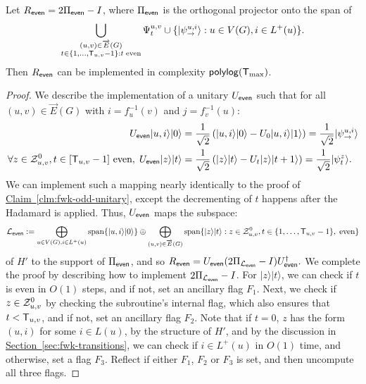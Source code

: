 \documentclass{theoretics}
\renewcommand{\sec}[1]{\hyperref[sec:#1]{Section~\ref*{sec:#1}}}
\newcommand{\clm}[1]{\hyperref[clm:#1]{Claim~\ref*{clm:#1}}}
\def\ket#1{{\lvert}#1\rangle}
\renewcommand{\>}{\rangle}
\newcommand{\<}{\langle}
\renewcommand{\(}{\left(}
\renewcommand{\)}{\right)}
\begin{document}
\begin{claim}\label{clm:fwk-even-unitary}
Let $R_{\sf even} =2\Pi_{\sf even}-I$, where $\Pi_{\sf even}$ is the orthogonal projector onto the span of
$$\bigcup_{\substack{(u,v)\in\overrightarrow{E}(G)\\t\in\{1,\dots,{\sf T}_{u,v}-1\}: t\;\mathrm{ even}}}\Psi_t^{u,v}\cup\{\ket{\psi_{\rightarrow}^{u,i}}:u\in V(G),i\in L^+(u)\}.$$
Then $R_{\sf even}$ can be implemented in complexity ${\sf polylog}({\sf T}_{\max})$. 
\end{claim}
\begin{proof}
We describe the implementation of a unitary $U_{\sf even}$ such that for all $(u,v)\in\overrightarrow{E}(G)$ with $i=f_u^{-1}(v)$ and $j=f_v^{-1}(u)$:
\vskip-18pt
\begin{equation*}
\begin{split}
U_{\sf even}\ket{u,i}\ket{0} &= \frac{1}{\sqrt{2}}\left(\ket{u,i}\ket{0} - U_0\ket{u,i}\ket{1} \right)
= \frac{1}{\sqrt{2}}\ket{\psi_{\rightarrow}^{u,i}}\\
\forall z\in {\cal Z}_{u,v}^0, t\in [{\sf T}_{u,v}-1]\text{ even}, \;%
U_{\sf even}\ket{z}\ket{t} &= \frac{1}{\sqrt{2}}\left(\ket{z}\ket{t} -U_t\ket{z}\ket{t+1}\right) 
= \frac{1}{\sqrt{2}}\ket{\psi_{t}^z}.
\end{split}\label{eq:U-S-1}
\end{equation*}
We can implement such a mapping nearly identically to the proof of \clm{fwk-odd-unitary}, except the decrementing of $t$ happens after the Hadamard is applied. Thus, $U_{\sf even}$ maps the subspace:
$${\cal L}_{\sf even}:=\bigoplus_{u\in V(G), i\in L^+(u)}\mathrm{span}\{\ket{u,i}\ket{0}\}\oplus\bigoplus_{(u,v)\in\overrightarrow{E}(G)}\mathrm{span}\{\ket{z}\ket{t}:z\in{\cal Z}_{u,v}^0,t\in\{1,\dots,{\sf T}_{u,v}-1\},\;\mbox{even}\}$$
of $H'$ to the support of $\Pi_{\sf even}$, and so
$R_{\sf even}=U_{\sf even}(2\Pi_{{\cal L}_{\sf even}}-I)U_{\sf even}^\dagger.$
We complete the proof by describing how to implement $2\Pi_{{\cal L}_{\sf even}}-I$. For $\ket{z}\ket{t}$, we can check if $t$ is even in $O(1)$ steps, and if not, set an ancillary flag $F_1$. Next, we check if $z\in {\cal Z}_{u,v}^0$ by checking the subroutine's internal flag, which also ensures that $t<{\sf T}_{u,v}$, and if not, set an ancillary flag $F_2$. Note that if $t=0$, $z$ has the form $(u,i)$ for some $i\in L(u)$, by the structure of $H'$, and by the discussion in \sec{fwk-transitions}, we can check if $i\in L^+(u)$ in $O(1)$ time, and otherwise, set a flag $F_3$. Reflect if either $F_1$, $F_2$ or $F_3$ is set, and then uncompute all three flags.
\end{proof}
\end{document}
